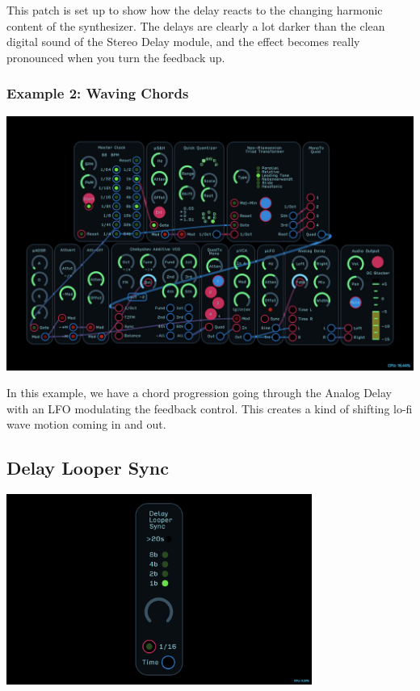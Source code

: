 \documentclass[11pt]{book}
\begin{document}
\begin{multicols*}{2}
This patch is set up to show how the delay reacts to the changing harmonic content of the synthesizer. The delays are clearly a lot darker than the clean digital sound of the Stereo Delay module, and the effect becomes really pronounced when you turn the feedback up.

\subsubsection*{Example 2: Waving Chords}

\begin{center}
\includegraphics[width=0.95\linewidth]{analog-delay-fig2.png}
\end{center}

In this example, we have a chord progression going through the Analog Delay with an LFO modulating the feedback control. This creates a kind of shifting lo-fi wave motion coming in and out.

\end{multicols*}

\pagebreak


\subsection{Delay Looper Sync}

\begin{center}
\includegraphics[width=0.75\textwidth]{delay-looper-sync.png}
\end{center}
\end{document}
